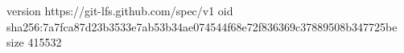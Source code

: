 version https://git-lfs.github.com/spec/v1
oid sha256:7a7fca87d23b3533e7ab53b34ae074544f68e72f836369c37889508b347725be
size 415532

